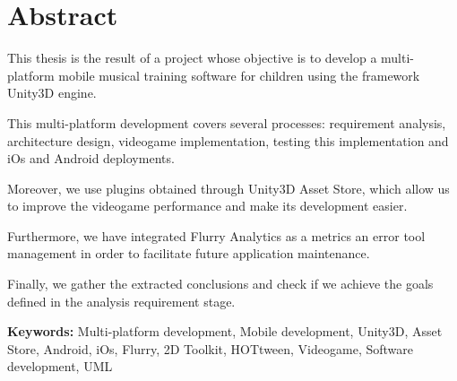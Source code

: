 \cleardoublepage
{}
\chapter*{Abstract}

This thesis is the result of a project whose objective is to develop a multi-platform mobile musical training software for children using the framework Unity3D engine.

This multi-platform development covers several processes: requirement analysis, architecture design, videogame implementation, testing this implementation and iOs and Android deployments.

Moreover, we use plugins obtained through Unity3D Asset Store, which allow us to improve the videogame performance and make its development easier.

Furthermore, we have integrated Flurry Analytics as a metrics an error tool management in order to facilitate future application maintenance.

Finally, we gather the extracted conclusions and check if we achieve the goals defined in the analysis requirement stage.


\vfill
\textbf{Keywords:} Multi-platform development, Mobile development, Unity3D, Asset Store, Android, iOs, Flurry, 2D Toolkit, HOTtween, Videogame, Software development, UML